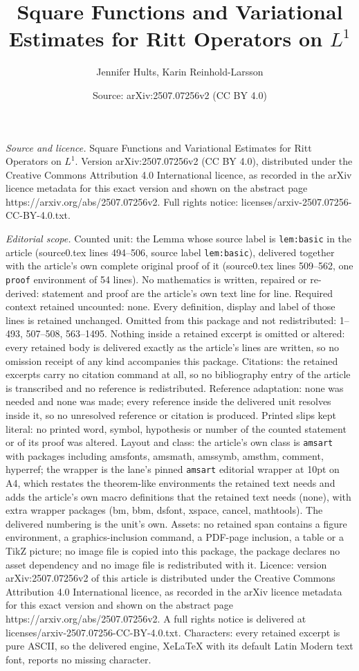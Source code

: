 \documentclass[10pt,a4paper]{amsart}
\title[Square Functions and Variational Estimates for Ritt Operator]{Square Functions and Variational Estimates for Ritt Operators on $L^1$}
\author{Jennifer Hults, Karin Reinhold-Larsson}
\date{Source: arXiv:2507.07256v2 (CC BY 4.0)}
\begin{document}
\maketitle

\noindent\emph{Source and licence.} Square Functions and Variational Estimates for Ritt Operators on $L^1$. Version arXiv:2507.07256v2 (CC BY 4.0), distributed under the Creative Commons Attribution 4.0 International licence, as recorded in the arXiv licence metadata for this exact version and shown on the abstract page https://arxiv.org/abs/2507.07256v2. Full rights notice: licenses/arxiv-2507.07256-CC-BY-4.0.txt.\par\smallskip

\noindent\textit{Editorial scope.} Counted unit: the Lemma whose source label is \texttt{lem:basic} in the article (source0.tex lines 494--506, source label \texttt{lem:basic}), delivered together with the article's own complete original proof of it (source0.tex lines 509--562, one \texttt{proof} environment of 54 lines). No mathematics is written, repaired or re-derived: statement and proof are the article's own text line for line. Required context retained uncounted: none. Every definition, display and label of those lines is retained unchanged. Omitted from this package and not redistributed: 1--493, 507--508, 563--1495. Nothing inside a retained excerpt is omitted or altered: every retained body is delivered exactly as the article's lines are written, so no omission receipt of any kind accompanies this package. Citations: the retained excerpts carry no citation command at all, so no bibliography entry of the article is transcribed and no reference is redistributed. Reference adaptation: none was needed and none was made; every reference inside the delivered unit resolves inside it, so no unresolved reference or citation is produced. Printed slips kept literal: no printed word, symbol, hypothesis or number of the counted statement or of its proof was altered. Layout and class: the article's own class is \texttt{amsart} with packages including amsfonts, amsmath, amssymb, amsthm, comment, hyperref; the wrapper is the lane's pinned \texttt{amsart} editorial wrapper at 10pt on A4, which restates the theorem-like environments the retained text needs and adds the article's own macro definitions that the retained text needs (none), with extra wrapper packages (bm, bbm, dsfont, xspace, cancel, mathtools). The delivered numbering is the unit's own. Assets: no retained span contains a figure environment, a graphics-inclusion command, a PDF-page inclusion, a table or a TikZ picture; no image file is copied into this package, the package declares no asset dependency and no image file is redistributed with it. Licence: version arXiv:2507.07256v2 of this article is distributed under the Creative Commons Attribution 4.0 International licence, as recorded in the arXiv licence metadata for this exact version and shown on the abstract page https://arxiv.org/abs/2507.07256v2. A full rights notice is delivered at licenses/arxiv-2507.07256-CC-BY-4.0.txt. Characters: every retained excerpt is pure ASCII, so the delivered engine, XeLaTeX with its default Latin Modern text font, reports no missing character.
\end{document}
